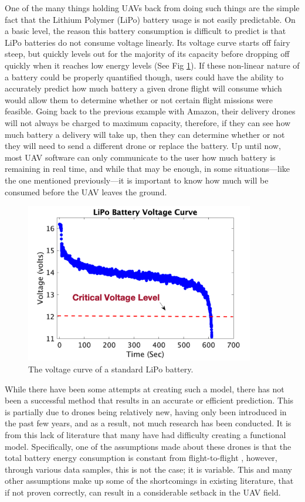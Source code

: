 \documentclass{article}
\begin{document}
One of the many things holding UAVs back from doing such things are the simple fact that the Lithium Polymer (LiPo) battery usage is not easily predictable. On a basic level, the reason this battery consumption is difficult to predict is that LiPo batteries do not consume voltage linearly. Its voltage curve starts off fairy steep, but quickly levels out for the majority of its capacity before dropping off quickly when it reaches low energy levels (See Fig \ref{fig:volt}). If these non-linear nature of a battery could be properly quantified though, users could have the ability to accurately predict how much battery a given drone flight will consume which would allow them to determine whether or not certain flight missions were feasible. Going back to the previous example with Amazon, their delivery drones will not always be charged to maximum capacity, therefore, if they can see how much battery a delivery will take up, then they can determine whether or not they will need to send a different drone or replace the battery. Up until now, most UAV software can only communicate to the user how much battery is remaining in real time, and while that may be enough, in some situations—like the one mentioned previously—it is important to know how much will be consumed before the UAV leaves the ground.\par

\begin{figure}
  \centering
  \includegraphics[width = 100mm]{images/voltage.png}
  \caption{The voltage curve of a standard LiPo battery.}
  \label{fig:volt}
\end{figure}

While there have been some attempts at creating such a model, there has not been a successful method that results in an accurate or efficient prediction. This is partially due to drones being relatively new, having only been introduced in the past few years, and as a result, not much research has been conducted. It is from this lack of literature that many have had difficulty creating a functional model. Specifically, one of the assumptions made about these drones is that the total battery energy consumption is constant from flight-to-flight \cite{Prasetia}, however, through various data samples, this is not the case; it is variable. This and many other assumptions make up some of the shortcomings in existing literature, that if not proven correctly, can result in a considerable setback in the UAV field. 
\end{document}
